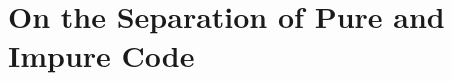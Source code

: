 \section[On the Separation of Pure and Impure Code]{On the Separation of Pure and Impure Code}
\label{sec:pure}

\lipsum[1]